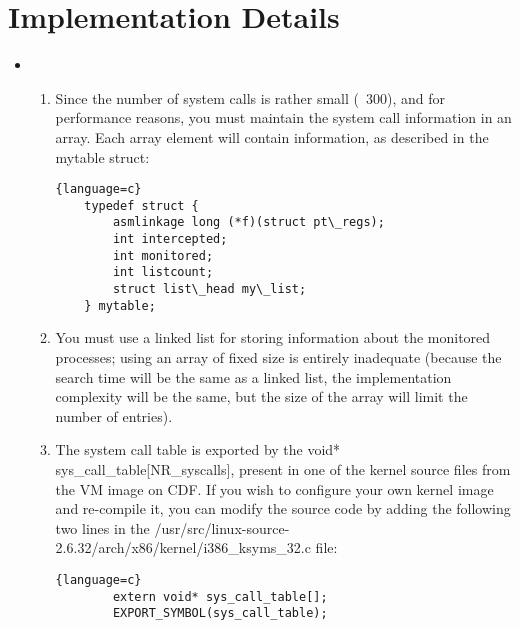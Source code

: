 \documentclass[12pt]{article}
\begin{document}
\section{Implementation Details}

\bigskip

\begin{itemize}
    \item

    \begin{enumerate}[1.]

    \item Since the number of system calls is rather small (~300), and for performance reasons, you must maintain the system call information in an array. Each array element will contain information, as described in the mytable struct:

    \begin{lstlisting}{language=c}
    typedef struct {
        asmlinkage long (*f)(struct pt\_regs);
        int intercepted;
        int monitored;
        int listcount;
        struct list\_head my\_list;
    } mytable;
    \end{lstlisting}
    \item You must use a linked list for storing information about the monitored processes; using an array of fixed size is entirely inadequate (because the search time will be the same as a linked list, the implementation complexity will be the same, but the size of the array will limit the number of entries).
    \item The system call table is exported by the void* sys\_call\_table[NR\_syscalls], present in one of the kernel source files from the VM image on CDF. If you wish to configure your own kernel image and re-compile it, you can modify the source code by adding the following two lines in the /usr/src/linux-source-2.6.32/arch/x86/kernel/i386\_ksyms\_32.c file:

    \begin{lstlisting}{language=c}
        extern void* sys_call_table[];
        EXPORT_SYMBOL(sys_call_table);
    \end{lstlisting}


\end{enumerate}
\end{itemize}
\end{document}
